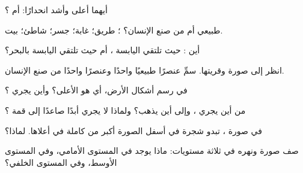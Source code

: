 \begin{exercise}[$\star$]\label{exo:g1:landscapes-around-us:2}
أيهما أعلى وأشد انحدارًا:  أم ؟
\end{exercise}

\begin{exercise}[$\star$]\label{exo:g1:landscapes-around-us:3}
طبيعي أم من صنع الإنسان؟ ؛ طريق؛ غابة؛ جسر؛ شاطئ؛ بيت.
\end{exercise}

\begin{exercise}[$\star$]\label{exo:g1:landscapes-around-us:4}
أين : حيث تلتقي اليابسة ، أم حيث تلتقي اليابسة
بالبحر؟
\end{exercise}

\begin{exercise}[$\star$]\label{exo:g1:landscapes-around-us:5}
انظر إلى صورة  وقريتها. سمِّ عنصرًا طبيعيًا واحدًا وعنصرًا واحدًا
من صنع الإنسان.
\end{exercise}

\begin{exercise}[$\star$]\label{exo:g1:landscapes-around-us:6}
في رسم أشكال الأرض، أي  هو الأعلى؟
وأين يجري ؟
\end{exercise}

\begin{exercise}[$\star\star$]\label{exo:g1:landscapes-around-us:7}
من أين يجري ، وإلى أين يذهب؟ ولماذا لا يجري أبدًا صاعدًا إلى قمة
؟
\end{exercise}

\begin{exercise}[$\star\star$]\label{exo:g1:landscapes-around-us:8}
في صورة ، تبدو شجرة في أسفل الصورة أكبر من  كاملة في أعلاها.
لماذا؟
\end{exercise}

\begin{exercise}[$\star\star$]\label{exo:g1:landscapes-around-us:9}
صف صورة  ونهره في ثلاثة مستويات: ماذا يوجد في المستوى الأمامي،
وفي المستوى الأوسط، وفي المستوى الخلفي؟
\end{exercise}


